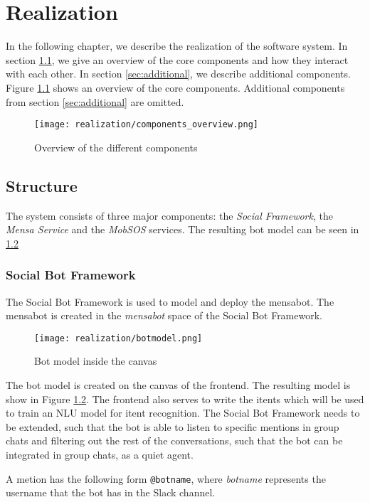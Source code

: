 \chapter{Realization}
In the following chapter, we describe the realization of the software system. In section \ref{sec:structure}, we give an overview of the core components and how they interact with each other. 
In section \ref{sec:additional}, we describe additional components. Figure \ref{fig:componentsOverview} shows an overview of the core components. Additional components from section \ref{sec:additional} are omitted.


\begin{figure}[h]
    \centering
    \texttt{[image: realization/components\_overview.png]}
    \caption{Overview of the different components}
    \label{fig:componentsOverview}
\end{figure}

\section{Structure}\label{sec:structure}
The system consists of three major components: the \emph{Social Framework}, the \emph{Mensa Service} and the \emph{MobSOS} services. 
The resulting bot model can be seen in \ref{fig:botmodel}
\subsection{Social Bot Framework}
The Social Bot Framework is used to model and deploy the mensabot. The mensabot is created in the \emph{mensabot} space of the Social Bot Framework.
\begin{figure}[h]
    \centering
    \texttt{[image: realization/botmodel.png]}
    \caption{Bot model inside the canvas}
    \label{fig:botmodel}
\end{figure}

The bot model is created on the canvas of the frontend. The resulting model is show in Figure \ref{fig:botmodel}. The frontend also serves to write the itents which will be used to train an NLU model for itent recognition. 
The Social Bot Framework needs to be extended, such that the bot is able to listen to specific mentions in group chats and filtering out the rest of the conversations, such that the bot can be integrated in group chats, as a quiet agent.

A metion has the following form \texttt{@botname}, where \emph{botname} represents the username that the bot has in the Slack channel.



